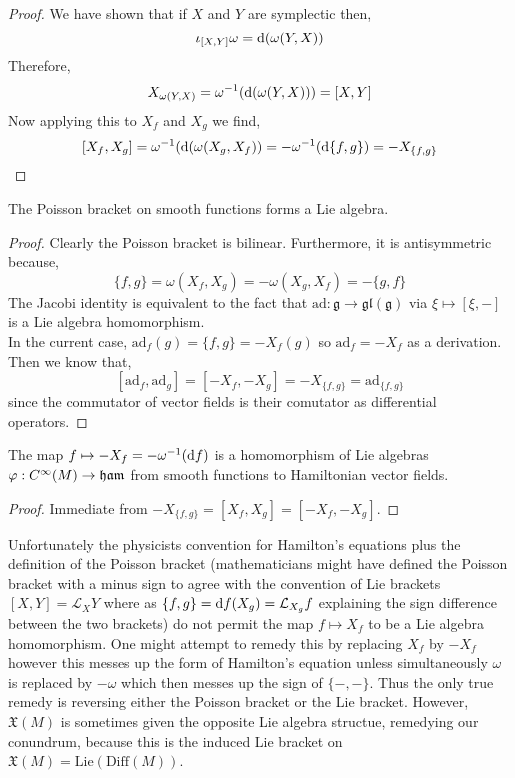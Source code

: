 \documentclass[12pt]{extarticle}
\renewcommand{\L}{\mathcal{L}}
\begin{document}
\begin{proof}
We have shown that if $X$ and $Y$ are symplectic then,
\[ \iota_{[X,Y]} \omega = \mathrm{d}{(\omega(Y, X))} \]
Therefore,
\[ X_{\omega(Y, X)} = \omega^{-1}(\mathrm{d}{(\omega(Y, X))}) = [X, Y] \]
Now applying this to $X_f$ and $X_g$ we find,
\[ [X_f, X_g] = \omega^{-1}(\mathrm{d}{(\omega(X_g, X_f)}) = - \omega^{-1}(\mathrm{d} \{f, g \}) = - X_{\{ f, g \}} \]
\end{proof}

\begin{proposition}
The Poisson bracket on smooth functions forms a Lie algebra.
\end{proposition}

\newcommand{\ad}{\mathrm{ad}}

\begin{proof}
Clearly the Poisson bracket is bilinear. Furthermore, it is antisymmetric because,
\[ \{ f ,g \} = \omega(X_f, X_g) = - \omega(X_g, X_f) = - \{ g, f \} \]
The Jacobi identity is equivalent to the fact that $\ad : \mathfrak{g} \to \mathfrak{gl}(\mathfrak{g})$ via $\xi \mapsto [\xi, -]$ is a Lie algebra homomorphism. 
\bigskip\\
In the current case, $\ad_f(g) = \{ f, g \} = -X_f(g)$ so $\ad_f = -X_f$ as a derivation. Then we know that,
\[ [ \ad_f, \ad_g] = [-X_f, -X_g] = - X_{\{f, g\}} = \ad_{\{f, g \}} \]
since the commutator of vector fields is their comutator as differential operators. 
\end{proof}

\begin{proposition}
The map $f \mapsto -X_f = -\omega^{-1}(\mathrm{d}{f})$ is a homomorphism of Lie algebras $\varphi : C^{\infty}(M) \to \mathfrak{ham}$ from smooth functions to Hamiltonian vector fields.
\end{proposition}

\begin{proof}
Immediate from $-X_{\{f, g\}} = [X_f, X_g] = [- X_f, - X_g]$. 
\end{proof}

\newcommand{\X}{\mathfrak{X}}

\begin{rmk}
Unfortunately the physicists convention for Hamilton's equations plus the definition of the Poisson bracket (mathematicians might have defined the Poisson bracket with a minus sign to agree with the convention of Lie brackets $[X, Y] = \L_X Y$ where as $\{f, g \} = \d{f}(X_g) = \L_{X_g} f$ explaining the sign difference between the two brackets) do not permit the map $f \mapsto X_f$ to be a Lie algebra homomorphism. One might attempt to remedy this by replacing $X_f$ by $-X_f$ however this messes up the form of Hamilton's equation unless simultaneously $\omega$ is replaced by $-\omega$ which then messes up the sign of $\{ -, - \}$. Thus the only true remedy is reversing either the Poisson bracket or the Lie bracket. However, $\X(M)$ is sometimes given the opposite Lie algebra structue, remedying our conundrum, because this is the induced Lie bracket on $\X(M) = \mathrm{Lie}(\mathrm{Diff}(M))$.
\end{rmk}
\end{document}
